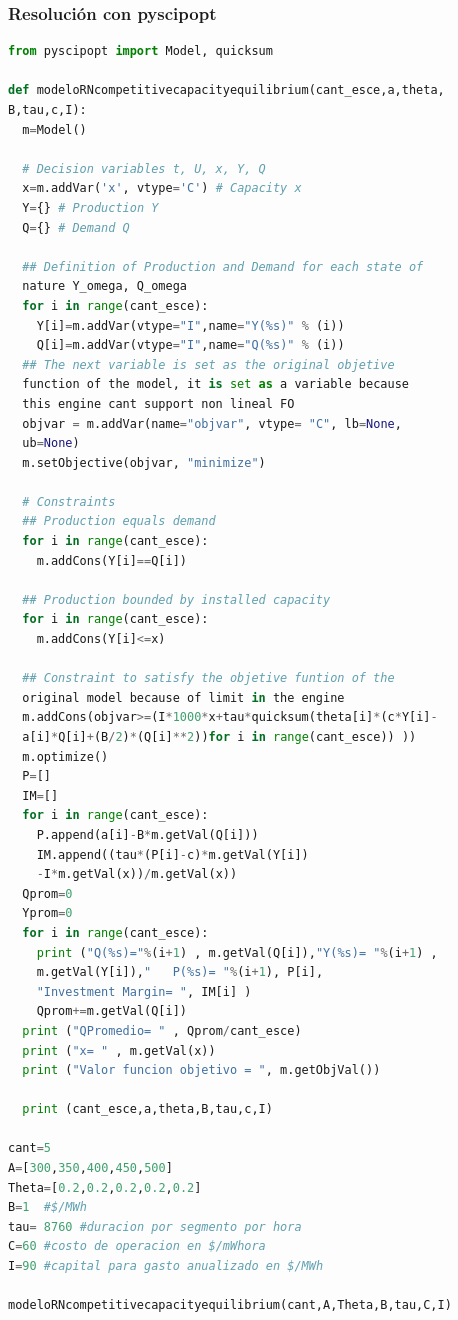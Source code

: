 \subsubsection{Resolución con pyscipopt}
\begin{footnotesize}
\begin{lstlisting}[language=Python]
from pyscipopt import Model, quicksum

def modeloRNcompetitivecapacityequilibrium(cant_esce,a,theta,
B,tau,c,I):
  m=Model()
  
  # Decision variables t, U, x, Y, Q
  x=m.addVar('x', vtype='C') # Capacity x
  Y={} # Production Y
  Q={} # Demand Q
  
  ## Definition of Production and Demand for each state of
  nature Y_omega, Q_omega
  for i in range(cant_esce):
    Y[i]=m.addVar(vtype="I",name="Y(%s)" % (i))
    Q[i]=m.addVar(vtype="I",name="Q(%s)" % (i))
  ## The next variable is set as the original objetive
  function of the model, it is set as a variable because
  this engine cant support non lineal FO
  objvar = m.addVar(name="objvar", vtype= "C", lb=None,
  ub=None)
  m.setObjective(objvar, "minimize")
  
  # Constraints
  ## Production equals demand    
  for i in range(cant_esce):
    m.addCons(Y[i]==Q[i])
  
  ## Production bounded by installed capacity  
  for i in range(cant_esce):
    m.addCons(Y[i]<=x)  
  
  ## Constraint to satisfy the objetive funtion of the
  original model because of limit in the engine   
  m.addCons(objvar>=(I*1000*x+tau*quicksum(theta[i]*(c*Y[i]-
  a[i]*Q[i]+(B/2)*(Q[i]**2))for i in range(cant_esce)) ))
  m.optimize()
  P=[]
  IM=[]
  for i in range(cant_esce):
    P.append(a[i]-B*m.getVal(Q[i]))
    IM.append((tau*(P[i]-c)*m.getVal(Y[i])
    -I*m.getVal(x))/m.getVal(x))
  Qprom=0
  Yprom=0
  for i in range(cant_esce):
    print ("Q(%s)="%(i+1) , m.getVal(Q[i]),"Y(%s)= "%(i+1) ,
    m.getVal(Y[i]),"   P(%s)= "%(i+1), P[i],
    "Investment Margin= ", IM[i] )
    Qprom+=m.getVal(Q[i])
  print ("QPromedio= " , Qprom/cant_esce)
  print ("x= " , m.getVal(x))
  print ("Valor funcion objetivo = ", m.getObjVal())

  print (cant_esce,a,theta,B,tau,c,I)

cant=5
A=[300,350,400,450,500]
Theta=[0.2,0.2,0.2,0.2,0.2]
B=1  #$/MWh
tau= 8760 #duracion por segmento por hora
C=60 #costo de operacion en $/mWhora
I=90 #capital para gasto anualizado en $/MWh

modeloRNcompetitivecapacityequilibrium(cant,A,Theta,B,tau,C,I) 
\end{lstlisting}
\end{footnotesize}

